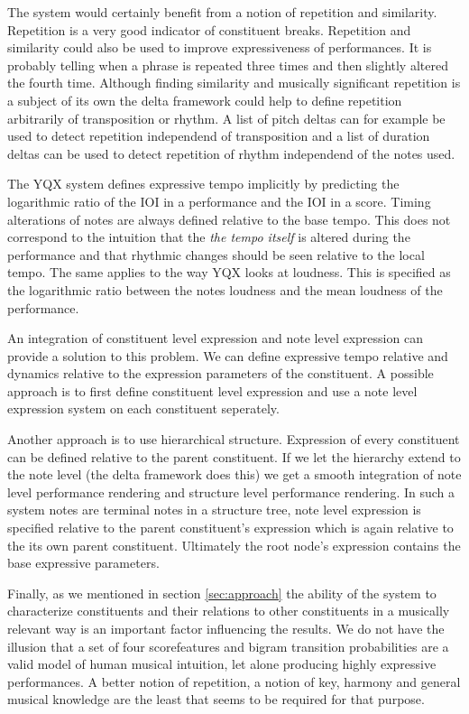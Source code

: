 \documentclass[a4paper,10pt]{article}
\begin{document}
The system would certainly benefit from a notion of repetition and similarity. Repetition is a very good indicator of constituent breaks. Repetition and similarity could also be used to improve expressiveness of performances. It is probably telling when a phrase is repeated three times and then slightly altered the fourth time. Although finding similarity and musically significant repetition is a subject of its own the delta framework could help to define repetition arbitrarily of transposition or rhythm. A list of pitch deltas can for example be used to detect repetition independend of transposition and a list of duration deltas can be used to detect repetition of rhythm independend of the notes used. 

The YQX system defines expressive tempo implicitly by predicting the logarithmic ratio of the IOI in a performance and the IOI in a score. Timing alterations of notes are always defined relative to the base tempo. This does not correspond to the intuition that the \textit{the tempo itself} is altered during the performance and that rhythmic changes should be seen relative to the local tempo. The same applies to the way YQX looks at loudness. This is specified as the logarithmic ratio between the notes loudness and the mean loudness of the performance. 

An integration of constituent level expression and note level expression can provide a solution to this problem. We can define expressive tempo relative and dynamics relative to the expression parameters of the constituent. A possible approach is to first define constituent level expression and use a note level expression system on each constituent seperately.

Another approach is to use hierarchical structure. Expression of every constituent can be defined relative to the parent constituent. If we let the hierarchy extend to the note level (the delta framework does this) we get a smooth integration of note level performance rendering and structure level performance rendering. In such a system notes are terminal notes in a structure tree, note level expression is specified relative to the parent constituent's expression which is again relative to the its own parent constituent. Ultimately the root node's expression contains the base expressive parameters.

Finally, as we mentioned in section \ref{sec:approach} the ability of the system to characterize constituents and their relations to other constituents in a musically relevant way is an important factor influencing the results. We do not have the illusion that a set of four scorefeatures and bigram transition probabilities are a valid model of human musical intuition, let alone producing highly expressive performances. A better notion of repetition, a notion of key, harmony and general musical knowledge are the least that seems to be required for that purpose.
\end{document}
